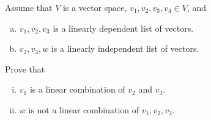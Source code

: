 \begin{question}
	\normalfont
	

	
	Assume that $V$ is a vector space, $v_1,v_2,v_3,v_4\in V$, and
	\begin{enumerate}[(a)]
		\item $v_1,v_2,v_3$ \hspace{.1cm} is a linearly dependent list of vectors.
		\item $v_2,v_3,w$ \hspace{.1cm} is a linearly independent list of vectors.
	\end{enumerate}
	Prove that
	\begin{enumerate}[(i)]
		\item $v_1$ is a linear combination of $v_2$ and $v_3$.
		\item $w$ is not a linear combination of $v_1, v_2, v_3$.
	\end{enumerate}

	
\end{question}